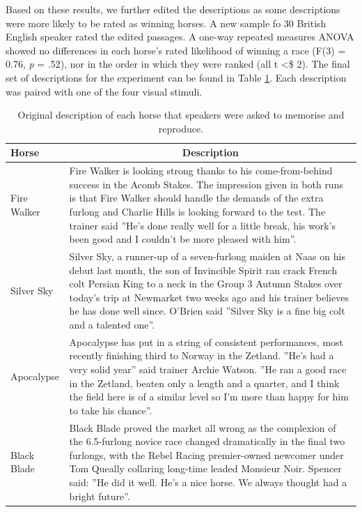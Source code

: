 \documentclass[
  man,floatsintext]{apa7}
\begin{document}
Based on these results, we further edited the descriptions as some descriptions were more likely to be rated as winning horses. A new sample fo 30 British English speaker rated the edited passages. A one-way repeated measures ANOVA showed no differences in each horse's rated likelihood of winning a race (F(3) = 0.76, \emph{p} = .52), nor in the order in which they were ranked (all \textbar t\textbar{} \textless\$ 2). The final set of descriptions for the experiment can be found in Table \ref{tab:tab-horse-description-text}. Each description was paired with one of the four visual stimuli.

\begin{table}[tbp]

\begin{center}
\begin{threeparttable}

\caption{\label{tab:tab-horse-description-text}Original description of each horse that speakers were asked to memorise and reproduce.}

\begin{tabular}{m{2cm}m{13cm}}
\toprule
Horse & \multicolumn{1}{c}{Description}\\
\midrule
Fire Walker & Fire Walker is looking strong thanks to his come-from-behind success in the Acomb Stakes. The impression given in both runs is that Fire Walker should handle the demands of the extra furlong and Charlie Hills is looking forward to the test. The trainer said ''He's done really well for a little break, his work's been good and I couldn't be more pleased with him''.\\
Silver Sky & Silver Sky, a runner-up of a seven-furlong maiden at Naas on his debut last month, the son of Invincible Spirit ran crack French colt Persian King to a neck in the Group 3 Autumn Stakes over today's trip at Newmarket two weeks ago and his trainer believes he has done well since. O'Brien said ''Silver Sky is a fine big colt and a talented one''.\\
Apocalypse & Apocalypse has put in a string of consistent performances, most recently finishing third to Norway in the Zetland. ''He's had a very solid year'' said trainer Archie Watson. ''He ran a good race in the Zetland, beaten only a length and a quarter, and I think the field here is of a similar level so I'm more than happy for him to take his chance''.\\
Black Blade & Black Blade proved the market all wrong as the complexion of the 6.5-furlong novice race changed dramatically in the final two furlongs, with the Rebel Racing premier-owned newcomer under Tom Queally collaring long-time leaded Monsieur Noir. Spencer said: ''He did it well. He's a nice horse. We always thought had a bright future''.\\
\bottomrule
\end{tabular}

\end{threeparttable}
\end{center}

\end{table}
\end{document}
